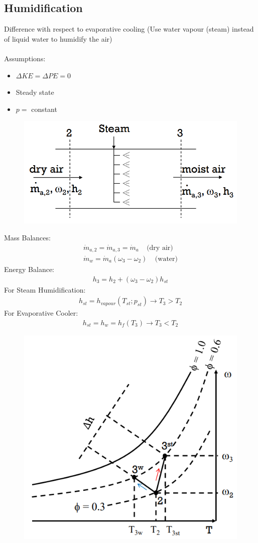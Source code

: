 \documentclass[class=report, crop=false, 12pt,a4paper]{standalone}
\numberwithin{equation}{section}
\begin{document}
\subsection{Humidification}
Difference with respect to evaporative cooling (Use water vapour (steam) instead of liquid water to humidify the air) \\\\
Assumptions: 
\begin{itemize}[noitemsep]
  \item $\Delta KE = \Delta PE = 0$
  \item Steady state
  \item $p =$ constant
\end{itemize}
\begin{figure}[H]
  \centering
  \includegraphics[width = 0.65 \textwidth]{../img/diagram117.png}
  \caption{}
\end{figure}
Mass Balances:
\begin{gather}
  \dot{m}_{a,2} = \dot{m}_{a,3} = \dot{m}_{a} \ \ \ \ \ \text{(dry air)} \\[5pt]
  \dot{m}_{w} = \dot{m}_{a}(\omega_3-\omega_2) \ \ \ \ \ \text{(water)}
\end{gather}
Energy Balance:
\begin{gather}
  h_3 = h_2 + (\omega_3-\omega_2)h_{st}
\end{gather}
For Steam Humidification:
\begin{gather}
  h_{st} = h_{vapour}(T_{st};p_{st}) \longrightarrow T_3>T_2
\end{gather}
For Evaporative Cooler:
\begin{gather}
  h_{st} = h_{w} = h_{f}(T_3) \longrightarrow T_3<T_2
\end{gather}
\begin{figure}[H]
  \centering
  \includegraphics[width = 0.6 \textwidth]{../img/diagram118.png}
  \caption{}
\end{figure}
\end{document}

